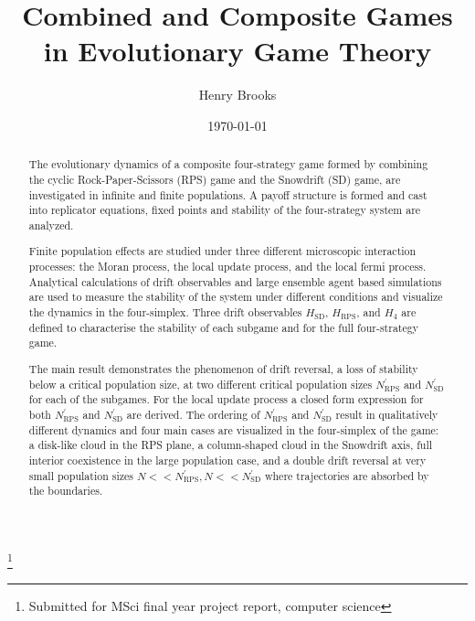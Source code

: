 \documentclass[%
 reprint,
 amsmath,amssymb,
 aps,
]{revtex4-2}
\begin{document}

\title{Combined and Composite Games in Evolutionary Game Theory}%
\thanks{Submitted for MSci final year project report, computer science}%

\author{Henry Brooks}
%


\date{\today}%

\begin{abstract}
The evolutionary dynamics of a composite four-strategy game formed by combining the cyclic Rock-Paper-Scissors (RPS)
game and the Snowdrift (SD) game, are investigated in infinite and finite populations. A payoff structure is
formed and cast into replicator equations, fixed points and stability of the four-strategy system are 
analyzed.

Finite population effects are studied under three different microscopic interaction processes:
the Moran process, the local update process, and the local fermi process. Analytical calculations
of drift observables and large ensemble agent based simulations are used to 
measure the stability of the system under different conditions and visualize the 
dynamics in the four-simplex.
Three drift observables $H_{\mathrm{SD}}$, $H_{\mathrm{RPS}}$, and $H_4$ are defined to 
characterise the stability of each subgame and for the full four-strategy game.

The main result demonstrates the phenomenon of drift reversal, a loss of stability below a critical population size, 
at two different critical population sizes $N^\prime_{\mathrm{RPS}}$ and 
$N^\prime_{\mathrm{SD}}$ for each of the subgames. For the local update process a closed form expression for 
both $N^\prime_{\mathrm{RPS}}$ and $N^\prime_{\mathrm{SD}}$ are derived.
The ordering of $N^\prime_{\mathrm{RPS}}$ and $N^\prime_{\mathrm{SD}}$ result in qualitatively different
dynamics and four main cases are visualized in the four-simplex of the game: 
a disk-like cloud in the RPS plane, a column-shaped cloud in the Snowdrift axis, full interior coexistence in the large 
population case, and a double drift reversal at very small population sizes $N << N^\prime_{\mathrm{RPS}}, 
N << N^\prime_{\mathrm{SD}}$ where trajectories are absorbed by the boundaries. 
\end{abstract}

\maketitle
\end{document}
